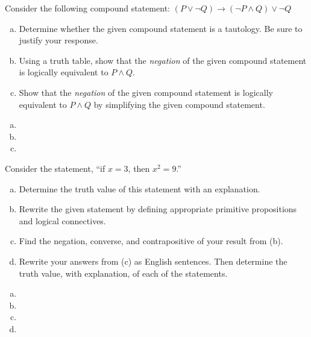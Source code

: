 \documentclass[11pt,letterpaper]{article}
\begin{document}
\newpage



 Consider the following compound statement: $(P \vee \neg Q) \to (\neg P \wedge Q) \vee \neg Q$
	\begin{enumerate}[(a)]
	\item Determine whether the given compound statement is a tautology. Be sure to justify your response. 
	\item Using a truth table, show that the \textit{negation} of the given compound statement is logically equivalent to $P \wedge Q$. 
	\item Show that the \textit{negation} of the given compound statement is logically equivalent to $P \wedge Q$ by simplifying the given compound statement.
	\end{enumerate} \pspace

\sol
\begin{enumerate}[(a)]
\item 
\item 
\item 
\end{enumerate}



\newpage



 Consider the statement, ``if $x= 3$, then $x^2= 9$.''
	\begin{enumerate}[(a)]
	\item Determine the truth value of this statement with an explanation. 
	\item Rewrite the given statement by defining appropriate primitive propositions and logical connectives. 
	\item Find the negation, converse, and contrapositive of your result from (b).
	\item Rewrite your answers from (c) as English sentences. Then determine the truth value, with explanation, of each of the statements. 
	\end{enumerate} \pspace

\sol
\begin{enumerate}[(a)]
\item 
\item 
\item 
\item  
\end{enumerate}
\end{document}
